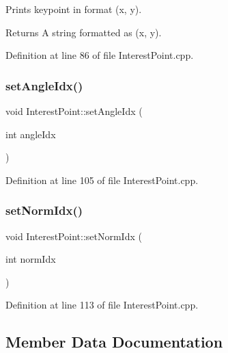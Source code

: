 Prints keypoint in format (x, y).

\begin{DoxyReturn}{Returns}
A string formatted as (x, y). 
\end{DoxyReturn}


Definition at line 86 of file Interest\+Point.\+cpp.

\mbox{\label{classdefals_1_1_interest_point_a8fa7d8032a91b91a85eafefd2f46988e}} 
\subsubsection{\texorpdfstring{set\+Angle\+Idx()}{setAngleIdx()}}
{\footnotesize\ttfamily void Interest\+Point\+::set\+Angle\+Idx (\begin{DoxyParamCaption}\item[{int}]{angle\+Idx }\end{DoxyParamCaption})}



Definition at line 105 of file Interest\+Point.\+cpp.

\mbox{\label{classdefals_1_1_interest_point_ab8d314ee9fd1482bf8705ad6615e06a0}} 
\subsubsection{\texorpdfstring{set\+Norm\+Idx()}{setNormIdx()}}
{\footnotesize\ttfamily void Interest\+Point\+::set\+Norm\+Idx (\begin{DoxyParamCaption}\item[{int}]{norm\+Idx }\end{DoxyParamCaption})}



Definition at line 113 of file Interest\+Point.\+cpp.



\subsection{Member Data Documentation}
\mbox{\label{classdefals_1_1_interest_point_a635589d58f12cab7408e4068f6cf5828}} 
